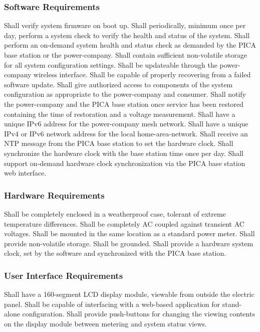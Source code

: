 \subsubsection{Software Requirements}
\begin{outline}[enumerate]
\1 Shall verify system firmware on boot up.
\1 Shall periodically, minimum once per day, perform a system check to verify the health and status of the system.
\1 Shall perform an on-demand system health and status check as demanded by the PICA base station or the power-company.
\1 Shall contain sufficient non-volatile storage for all system configuration settings.
\1 Shall be updateable through the power-company wireless interface.
\1 Shall be capable of properly recovering from a failed software update.
\1 Shall give authorized access to components of the system configuration as appropriate to the power-company and consumer.
\1 Shall notify the power-company and the PICA base station once service has been restored containing the time of restoration and a voltage measurement.
\1 Shall have a unique IPv6 address for the power-company mesh network.
\1 Shall have a unique IPv4 or IPv6 network address for the local home-area-network. 
\1 Shall receive an \ac{NTP} message from the PICA base station to set the hardware clock. 
\1 Shall synchronize the hardware clock with the base station time once per day. 
\1 Shall support on-demand hardware clock synchronization via the PICA base station web interface.
\end{outline}

\subsubsection{Hardware Requirements}
\begin{outline}[enumerate]
\1 Shall be completely enclosed in a weatherproof case, tolerant of extreme temperature differences. 
\1 Shall be completely \ac{AC} coupled against transient \ac{AC} voltages. 
\1 Shall be mounted in the same location as a standard power meter. 
\1 Shall provide non-volatile storage.
\1 Shall be grounded.
\1 Shall provide a hardware system clock, set by the software and synchronized with the PICA base station.
\end{outline}

\subsubsection{User Interface Requirements}
\begin{outline}[enumerate]
\1 Shall have a 160-segment \ac{LCD} display module, viewable from outside the electric panel.
\1 Shall be capable of interfacing with a web-based application for stand-alone configuration.
\1 Shall provide push-buttons for changing the viewing contents on the display module between metering and system status views.
\end{outline}

